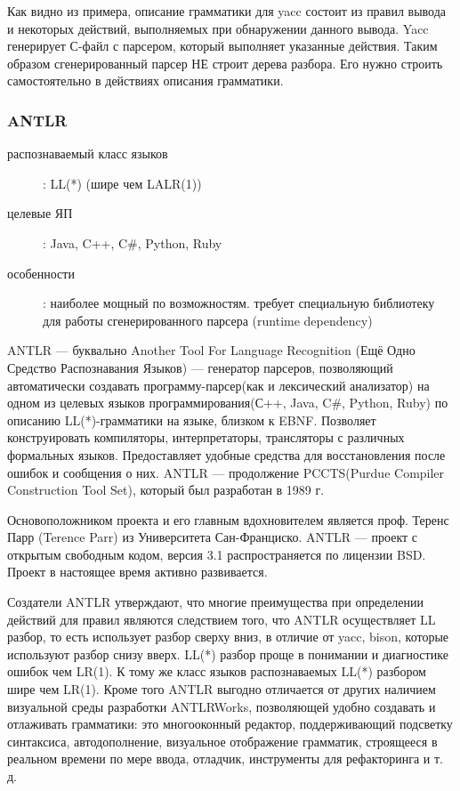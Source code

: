 \documentclass[a4paper,12pt]{article}
\begin{document}
Как видно из примера, описание грамматики для yacc состоит из правил вывода и
некоторых действий, выполняемых при обнаружении данного вывода.
Yacc генерирует С-файл с парсером, который выполняет указанные действия.
Таким образом сгенерированный парсер НЕ строит дерева разбора. Его нужно строить
самостоятельно в действиях описания грамматики.

\subsubsection{ANTLR}
\begin{description}
  \item[распознаваемый класс языков]: LL(*) (шире чем LALR(1))
  \item[целевые ЯП]: Java, C++, C\#, Python, Ruby
  \item[особенности]: наиболее мощный по возможностям. требует специальную
  библиотеку для работы сгенерированного парсера (runtime dependency)
\end{description}
ANTLR — буквально Another Tool For Language Recognition (Ещё Одно Средство
Распознавания Языков) — генератор парсеров, позволяющий автоматически создавать
программу-парсер(как и лексический анализатор) на одном из целевых языков
программирования(С++, Java, C\#, Python, Ruby) по описанию LL(*)-грамматики на
языке, близком к EBNF. Позволяет конструировать компиляторы, интерпретаторы,
трансляторы с различных формальных языков. Предоставляет удобные средства для
восстановления после ошибок и сообщения о них. ANTLR — продолжение PCCTS(Purdue
Compiler Construction Tool Set), который был разработан в 1989 г.

Основоположником проекта и его главным вдохновителем является проф. Теренс Парр
(Terence Parr) из Университета Сан-Франциско. ANTLR — проект с открытым
свободным кодом, версия 3.1 распространяется по лицензии BSD. Проект в
настоящее время активно развивается.

Создатели ANTLR утверждают, что многие преимущества при определении действий
для правил являются следствием того, что ANTLR осуществляет LL разбор, то есть
использует разбор сверху вниз, в отличие от yacc, bison, которые
используют разбор снизу вверх. LL(*) разбор проще в понимании и
диагностике ошибок чем LR(1). К тому же класс языков распознаваемых LL(*)
разбором шире чем LR(1). Кроме того ANTLR выгодно отличается от других наличием
визуальной среды разработки ANTLRWorks, позволяющей удобно создавать и
отлаживать грамматики: это многооконный редактор, поддерживающий подсветку
синтаксиса, автодополнение, визуальное отображение грамматик, строящееся в
реальном времени по мере ввода, отладчик, инструменты для рефакторинга и т. д.
\end{document}
